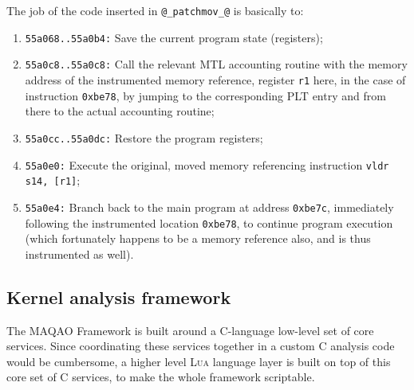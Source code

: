 \documentclass[11pt, a4paper, twoside]{montblanc2}
\def\lua{\textsc{Lua}\xspace}
\begin{document}
The job of the code inserted in \verb|@_patchmov_@| is basically to:
\begin{enumerate}
\item \texttt{55a068..55a0b4:} Save the current program state (registers);
\item \texttt{55a0c8..55a0c8:} Call the relevant MTL accounting routine with the 
memory address of the instrumented memory reference, register \texttt{r1} here, 
in the case of instruction \texttt{0xbe78}, by jumping to the corresponding PLT 
entry and from there to the actual accounting routine;
\item \texttt{55a0cc..55a0dc:} Restore the program registers;
\item \texttt{55a0e0:} Execute the original, moved memory referencing 
instruction \verb|vldr s14, [r1]|;
\item \texttt{55a0e4:} Branch back to the main program at address 
  \texttt{0xbe7c}, immediately following the instrumented location 
  \texttt{0xbe78}, to continue program execution (which fortunately happens to 
  be a memory reference also, and is thus instrumented as well).
\end{enumerate}

\subsection{Kernel analysis framework}


The MAQAO Framework is built around a C-language low-level set of core services. 
Since coordinating these services together in a custom C analysis code would be 
cumbersome, a higher level \lua language layer is built on top of this core set 
of C services, to make the whole framework scriptable.
\end{document}
